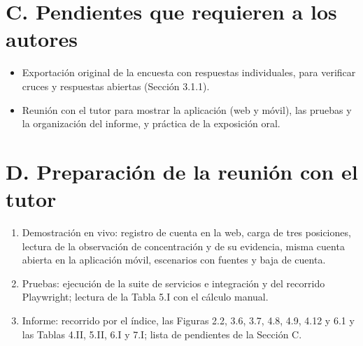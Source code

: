 \documentclass[a4paper,11pt]{article}
\begin{document}
\section*{C. Pendientes que requieren a los autores}
\begin{itemize}[nosep]
\item Exportación original de la encuesta con respuestas individuales, para verificar cruces y respuestas abiertas (Sección 3.1.1).
\item Reunión con el tutor para mostrar la aplicación (web y móvil), las pruebas y la organización del informe, y práctica de la exposición oral.
\end{itemize}

\section*{D. Preparación de la reunión con el tutor}
\begin{enumerate}[nosep]
\item Demostración en vivo: registro de cuenta en la web, carga de tres posiciones, lectura de la observación de concentración y de su evidencia, misma cuenta abierta en la aplicación móvil, escenarios con fuentes y baja de cuenta.
\item Pruebas: ejecución de la suite de servicios e integración y del recorrido Playwright; lectura de la Tabla 5.I con el cálculo manual.
\item Informe: recorrido por el índice, las Figuras 2.2, 3.6, 3.7, 4.8, 4.9, 4.12 y 6.1 y las Tablas 4.II, 5.II, 6.I y 7.I; lista de pendientes de la Sección C.
\end{enumerate}
\end{document}
